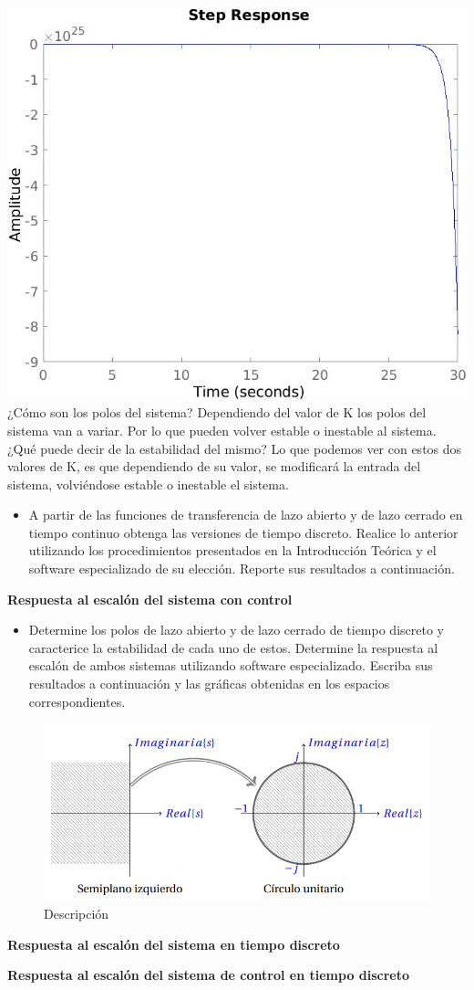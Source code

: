 \includegraphics[scale=0.36]{./img2/G6.jpg}\\
¿Cómo son los polos del sistema? Dependiendo del valor de K los polos del sistema van a variar. Por lo que pueden volver estable o inestable al sistema.\\
¿Qué puede decir de la estabilidad del mismo? Lo que podemos ver con estos dos valores de K, es que dependiendo de su valor, se modificará la entrada del sistema, volviéndose estable o inestable el sistema.

\begin{itemize}
	\item A partir de las funciones de transferencia de lazo abierto y de lazo cerrado en tiempo continuo obtenga las versiones de tiempo discreto. Realice lo anterior utilizando los procedimientos presentados en la
	Introducción Teórica y el software especializado de su elección. Reporte sus resultados a continuación.
\end{itemize}

\textbf{Respuesta al escalón del sistema con control}

\begin{itemize}
	\item Determine los polos de lazo abierto y de lazo cerrado de tiempo discreto y caracterice la estabilidad de
	cada uno de estos. Determine la respuesta al escalón de ambos sistemas utilizando software especializado.
	Escriba sus resultados a continuación y las gráficas obtenidas en los espacios correspondientes.
\end{itemize}
\begin{figure}[H]
	\centering
	\includegraphics[width=0.7\linewidth]{img2/000004}
	\caption{Descripción}
	\label{fig:000004}
\end{figure}

\textbf{Respuesta al escalón del sistema en tiempo discreto}

\textbf{Respuesta al escalón del sistema de control en tiempo discreto}
